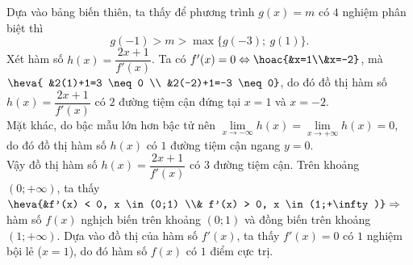 \begin{ex}
{\begin{itemchoice}
{
		}
		\begin{center}
		\end{center}
		Dựa vào bảng biến thiên, ta thấy để phương trình $g(x)=m$ có $4$ nghiệm phân biệt thì $$g(-1) > m > \max\{g(-3);\ g(1)\}.$$
		\itemch Xét hàm số $h(x)=\dfrac{2x+1}{f'(x)}$. Ta có $f'(x)=0 \Leftrightarrow \hoac{&x=1\\&x=-2}$, mà $\heva{ &2(1)+1=3 \neq 0 \\ &2(-2)+1=-3 \neq 0}$, do đó đồ thị hàm số $h(x)=\dfrac{2x+1}{f'(x)}$ có $2$ đường tiệm cận đứng tại $x=1$ và $x=-2$. \\
		  Mặt khác, do bậc mẫu lớn hơn bậc tử nên $\lim\limits_{x \to -\infty} h(x)=\lim\limits_{x \to +\infty} h(x)=0$, do đó đồ thị hàm số $h(x)$ có $1$ đường tiệm cận ngang $y=0$. \\
		  Vậy đồ thị hàm số $h(x)=\dfrac{2x+1}{f'(x)}$ có $3$ đường tiệm cận.
		  \itemch Trên khoảng $(0;+\infty)$, ta thấy $\heva{&f'(x) < 0, x \in (0;1) \\& f'(x) > 0, x \in (1;+\infty)} \Rightarrow$ hàm số $f(x)$ nghịch biến trên khoảng $(0;1)$ và đồng biến trên khoảng $(1;+\infty)$.
		  \itemch Dựa vào đồ thị của hàm số $f'(x)$, ta thấy $f'(x)=0$ có $1$ nghiệm bội lẻ ($x=1$), do đó hàm số $f(x)$ có $1$ điểm cực trị.
		\end{itemchoice}
	}
\end{ex}

